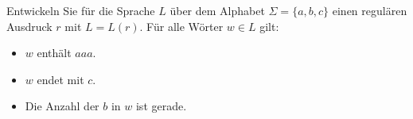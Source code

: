 \begin{exercise}

Entwickeln Sie f\"ur die Sprache $L$ \"uber dem 
Alphabet $\Sigma=\{a,b,c\}$ einen regul\"aren Ausdruck $r$ 
mit $L=L(r)$. F\"ur alle W\"orter $w\in L$ gilt:

\begin{itemize}
  \item $w$ enth\"alt $aaa$.
  \item $w$ endet mit $c$.
  \item Die Anzahl der $b$ in $w$ ist gerade.
\end{itemize}
	
\end{exercise}


